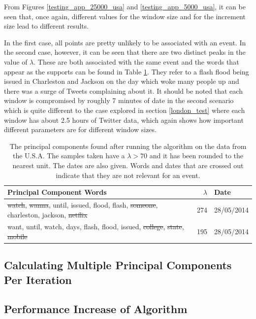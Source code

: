 \documentclass[11pt,a4paper]{article}
\begin{document}
From Figures \ref{testing_app_25000_usa} and \ref{testing_app_5000_usa}, it can be seen that, once again, different values for the window size and for the increment size lead to different results. 

In the first case, all points are pretty unlikely to be associated with an event. In the second case, however, it can be seen that there are two distinct peaks in the value of $\lambda$. These are both associated with the same event and the words that appear as the supports can be found in Table \ref{streaming_test_us}. They refer to a flash flood being issued in Charleston and Jackson on the day which woke many people up and there was a surge of Tweets complaining about it. It should be noted that each window is compromised by roughly 7 minutes of date in the second scenario which is quite different to the case explored in section \ref{london_test} where each window has about 2.5 hours of Twitter data, which again shows how important different parameters are for different window sizes. 
\begin{table}[H]
\center
\begin{tabular}{| l| r | l|}
\hline
Principal Component Words & $\lambda$ & Date\\
\hline
\st{watch}, \st{wanna}, until, issued, flood, flash, \st{someone}, charleston, jackson, \st{netflix} & 274 & 28/05/2014	 \\
want, until, watch, days, flash, flood, issued, \st{college}, \st{state}, \st{mobile}& 195 & 28/05/2014	 \\
\hline
\end{tabular}
\caption{The principal components found after running the algorithm on the data from the U.S.A. The samples taken have a $\lambda > 70$ and it has been rounded to the nearest unit. The dates are also given. Words and dates that are crossed out indicate that they are not relevant for an event.}
\label{streaming_test_us}
\end{table}

\subsection{Calculating Multiple Principal Components Per Iteration}
\subsection{Performance Increase of Algorithm}

\end{document}
